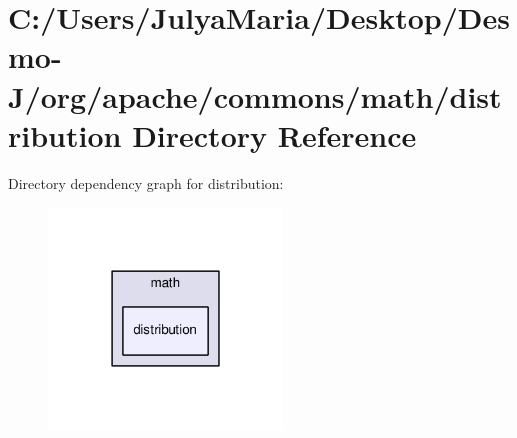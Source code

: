 \section{C\-:/\-Users/\-Julya\-Maria/\-Desktop/\-Desmo-\/\-J/org/apache/commons/math/distribution Directory Reference}
\label{dir_8a978f3e2fb4e7c98a8b396fff944ebf}
Directory dependency graph for distribution\-:
\nopagebreak
\begin{figure}[H]
\begin{center}
\leavevmode
\includegraphics[width=176pt]{dir_8a978f3e2fb4e7c98a8b396fff944ebf_dep}
\end{center}
\end{figure}
